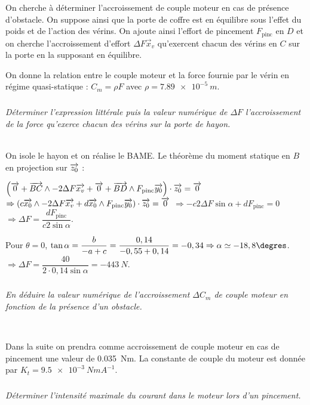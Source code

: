 \documentclass[10pt,fleqn]{article} %
\begin{document}
\begin{multicols}{2}
%

On cherche à déterminer l’accroissement de couple moteur en cas de présence d’obstacle. On suppose ainsi que la
porte de coffre est en équilibre sous l’effet du poids et de l’action des vérins. On ajoute ainsi l’effort de pincement
$ F_{\text{pinc}}$ en $D$ et on cherche l’accroissement d’effort $\Delta F\vec{x}_v$ qu’exercent chacun des vérins en $C$ sur la porte en la supposant en équilibre.

On donne la relation entre le couple moteur et la force fournie par le vérin en régime quasi-statique : $C_m=\rho F$ avec $\rho=\SI{7,89e-5}{m}$.
\subparagraph{}
\textit{Déterminer l’expression littérale puis la valeur
numérique de $\Delta F$ l’accroissement de la force qu’exerce chacun des vérins sur la porte de hayon.}
\ifprof
\begin{corrige}~\\
On isole le hayon et on réalise le BAME. Le théorème du moment statique en $B$ en projection sur $\overrightarrow{z_0}$ : 

$ \left( 
\overrightarrow{0} + \overrightarrow{BC}\wedge -2\Delta F \overrightarrow{x_v}
+ \overrightarrow{0} + \overrightarrow{BD}\wedge F_{\text{pinc}}\overrightarrow{y_0}
\right) \cdot \overrightarrow{z_0} = \overrightarrow{0} $
$\Rightarrow \left( 
c\overrightarrow{x_0}\wedge -2\Delta F \overrightarrow{x_v}
+ d\overrightarrow{x_0}\wedge F_{\text{pinc}}\overrightarrow{y_0}
\right) \cdot \overrightarrow{z_0} = \overrightarrow{0}$
$\Rightarrow  
-c 2\Delta F  \sin \alpha + dF_{\text{pinc}}  = {0} $
$\Rightarrow  
\Delta F  = \dfrac{dF_{\text{pinc}}}{c 2  \sin \alpha}  $. 

Pour $\theta=0$, $ \tan \alpha = \dfrac{b}{-a+c}=\dfrac{0,14}{-0,55+0,14}=-0,34 \Rightarrow \alpha \simeq -18,8 \degres$.
$\Rightarrow  
\Delta F  = \dfrac{40}{2\cdot 0,14  \sin \alpha} = \SI{-443}{N} $.
\end{corrige}
\else

\fi

\subparagraph{}
\textit{En déduire la valeur numérique de l’accroissement $\Delta C_m$  de couple moteur en fonction de la présence d’un obstacle.}%
\ifprof
\begin{corrige}~\\

\end{corrige}
\else
\fi

Dans la suite on prendra comme accroissement de couple moteur en cas de pincement une valeur de \SI{0,035}{Nm}. La constante de couple du moteur est donnée par $K_t = \SI{9,5e-3}{NmA^{-1}}$.
\subparagraph{}
\textit{Déterminer l’intensité maximale du courant dans le moteur lors d’un pincement.}
\ifprof
\begin{corrige}~\\

\end{corrige}
\else
\fi


\ifprof
\else
\end{multicols}
\fi
\end{document}
